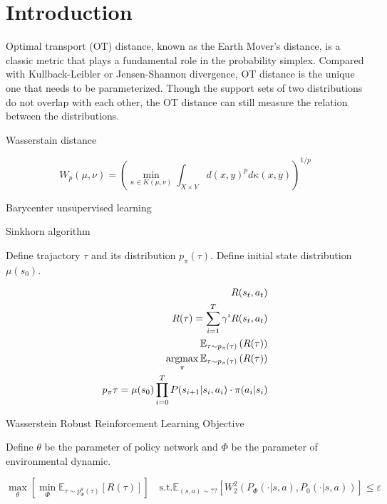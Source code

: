 \section{Introduction}


Optimal transport (OT) distance, known as the
Earth Mover’s distance, is a classic metric that plays a fundamental role in the probability simplex. 
Compared with Kullback-Leibler or Jensen-Shannon divergence, OT
distance is the unique one that needs to be parameterized.
Though the support sets of two distributions do not overlap with each other, the OT distance can still measure the
relation between the distributions. \cite{LiMengXue9157821}

Wasserstain distance

\begin{equation}
   W_p(\mu, \nu) = \left(
\min_{ \kappa \in K(\mu, \nu)}
\int_{X \times Y}
d(x,y)^p
d \kappa(x,y)
   \right)^{1/p}
\end{equation}

Barycenter
unsupervised learning

Sinkhorn algorithm

Define trajactory $\tau$ and its distribution $p_{\pi}(\tau)$. 
Define initial state distribution $\mu(s_0)$.


\begin{equation}
\begin{aligned}
R(s_t, a_t) \\
R(\tau) = \sum_{i=1}^{T} \gamma^i R(s_t, a_t) \\
\mathbb{E}_{\tau \sim p_{\pi}(\tau)} \left( R(\tau) \right) \\
\operatorname*{argmax}_{\pi} \mathbb{E}_{\tau \sim p_{\pi}(\tau)} \left( R(\tau) \right) \\
p_{\pi}{\tau} = \mu(s_0)  \prod_{i=0}^{T} P(s_{i+1} | s_i, a_i) \cdot \pi(a_i | s_i)
\end{aligned} 
\end{equation}
    
Wasserstein Robust Reinforcement Learning Objective

Define  $\theta$ be the parameter of policy network and 
$\Phi$ be the parameter of environmental dynamic.

\begin{equation}
    \max_{\theta} \left[
        \min_{\Phi} 
        \mathbb{E}_{\tau \sim p_{\Phi}^{\theta}(\tau)}
        [ R(\tau) ]
    \right]
    \quad 
    \text{s.t.}
    \mathbb{E}_{
        (s,a) \sim ??
    } [
        W^2_2 \left(
            P_{\Phi}( \cdot | s, a)
            ,
            P_0( \cdot | s, a)
        \right)
    ]
    \leq \varepsilon
\end{equation}